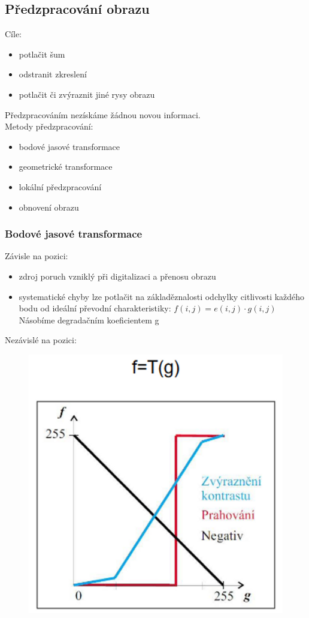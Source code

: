 \subsection{Předzpracování obrazu}
Cíle:
\begin{itemize}
    \item potlačit šum
    \item odstranit zkreslení
    \item potlačit či zvýraznit jiné rysy obrazu
\end{itemize}
Předzpracováním nezískáme žádnou novou informaci.\\
Metody předzpracování:
\begin{itemize}
    \item bodové jasové transformace
    \item geometrické transformace
    \item lokální předzpracování
    \item obnovení obrazu
\end{itemize}

\subsubsection{Bodové jasové transformace}
Závisle na pozici:
\begin{itemize}
    \item zdroj poruch vzniklý při digitalizaci a přenosu obrazu
    \item systematické chyby lze potlačit na základěznalosti odchylky citlivosti každého bodu od ideální převodní charakteristiky:
          $f(i,j) = e(i,j)\cdot g(i,j)$\\
          Násobíme degradačním koeficientem g
\end{itemize}
\newpage
Nezávislé na pozici:
\begin{figure}[H]
    \includegraphics[scale = 0.13]{images/transf_krivka.png}
\end{figure}

